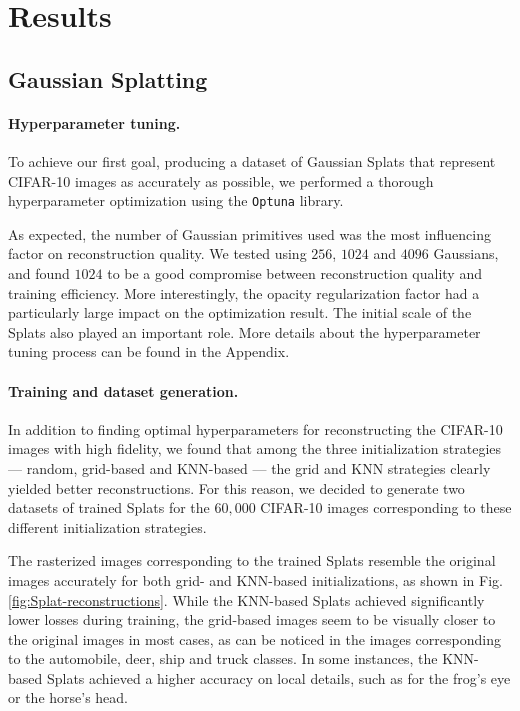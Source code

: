 \section{Results}
\label{sec:results}

\subsection{Gaussian Splatting}
\paragraph{Hyperparameter tuning.} To achieve our first goal, producing a dataset of Gaussian Splats that represent CIFAR-10 images as accurately as possible, we performed a thorough hyperparameter optimization using the \texttt{Optuna} library. 

As expected, the number of Gaussian primitives used was the most influencing factor on reconstruction quality. We tested using $256$, $1024$ and $4096$ Gaussians, and found $1024$ to be a good compromise between reconstruction quality and training efficiency. More interestingly, the opacity regularization factor had a particularly large impact on the optimization result. The initial scale of the Splats also played an important role. More details about the hyperparameter tuning process can be found in the Appendix.

\paragraph{Training and dataset generation.}
In addition to finding optimal hyperparameters for reconstructing the CIFAR-10 images with high fidelity, we found that among the three initialization strategies — random, grid-based and KNN-based — the grid and KNN strategies clearly yielded better reconstructions. For this reason, we decided to generate two datasets of trained Splats for the $60,000$ CIFAR-10 images corresponding to these different initialization strategies.

The rasterized images corresponding to the trained Splats resemble the original images accurately for both grid- and KNN-based initializations, as shown in Fig. \ref{fig:Splat-reconstructions}. While the KNN-based Splats achieved significantly lower losses during training, the grid-based images seem to be visually closer to the original images in most cases, as can be noticed in the images corresponding to the automobile, deer, ship and truck classes. In some instances, the KNN-based Splats achieved a higher accuracy on local details, such as for the frog's eye or the horse's head.


